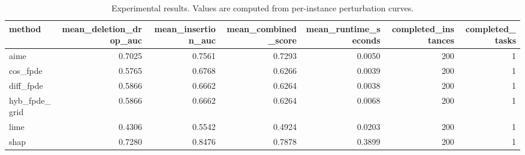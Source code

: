 \begin{table}[t]
\caption{Experimental results. Values are computed from per-instance perturbation curves.}
\label{tab:main_results_computed}
\centering
\begin{tabular}{lrrrrrr}
\toprule
method & mean\_deletion\_drop\_auc & mean\_insertion\_auc & mean\_combined\_score & mean\_runtime\_seconds & completed\_instances & completed\_tasks \\
\midrule
aime & 0.7025 & 0.7561 & 0.7293 & 0.0050 & 200 & 1 \\
cos\_fpde & 0.5765 & 0.6768 & 0.6266 & 0.0039 & 200 & 1 \\
diff\_fpde & 0.5866 & 0.6662 & 0.6264 & 0.0038 & 200 & 1 \\
hyb\_fpde\_grid & 0.5866 & 0.6662 & 0.6264 & 0.0068 & 200 & 1 \\
lime & 0.4306 & 0.5542 & 0.4924 & 0.0203 & 200 & 1 \\
shap & 0.7280 & 0.8476 & 0.7878 & 0.3899 & 200 & 1 \\
\bottomrule
\end{tabular}

\end{table}

